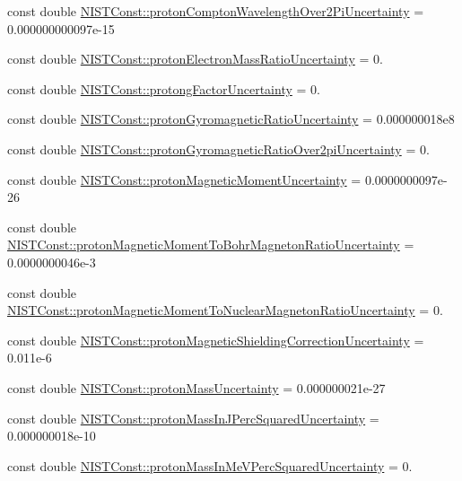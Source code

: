 \begin{DoxyCompactItemize}
\item 
const double \hyperlink{group___n_i_s_t_const-_proton_ga186c0793c8cc85f31697d61b2cce6131}{N\+I\+S\+T\+Const\+::proton\+Compton\+Wavelength\+Over2\+Pi\+Uncertainty} = 0.\+000000000097e-\/15
\item 
const double \hyperlink{group___n_i_s_t_const-_proton_ga32c824b498d8050a6b950467ed18344e}{N\+I\+S\+T\+Const\+::proton\+Electron\+Mass\+Ratio\+Uncertainty} = 0.
\item 
const double \hyperlink{group___n_i_s_t_const-_proton_ga0da65a4c99a5f1d339864c1f3e530a5b}{N\+I\+S\+T\+Const\+::protong\+Factor\+Uncertainty} = 0.
\item 
const double \hyperlink{group___n_i_s_t_const-_proton_gaa71b7de7eab3c78be5f0fa7851d284e2}{N\+I\+S\+T\+Const\+::proton\+Gyromagnetic\+Ratio\+Uncertainty} = 0.\+000000018e8
\item 
const double \hyperlink{group___n_i_s_t_const-_proton_ga107cde2344578ef79ee219b74184a25b}{N\+I\+S\+T\+Const\+::proton\+Gyromagnetic\+Ratio\+Over2pi\+Uncertainty} = 0.
\item 
const double \hyperlink{group___n_i_s_t_const-_proton_ga4ea801fdf73e61bbf8e984c88a50dabb}{N\+I\+S\+T\+Const\+::proton\+Magnetic\+Moment\+Uncertainty} = 0.\+0000000097e-\/26
\item 
const double \hyperlink{group___n_i_s_t_const-_proton_gae14639315fdecf1e78b18de5468b8acf}{N\+I\+S\+T\+Const\+::proton\+Magnetic\+Moment\+To\+Bohr\+Magneton\+Ratio\+Uncertainty} = 0.\+0000000046e-\/3
\item 
const double \hyperlink{group___n_i_s_t_const-_proton_gaa4c8406d5e6355f61b1c78ad5f85cda1}{N\+I\+S\+T\+Const\+::proton\+Magnetic\+Moment\+To\+Nuclear\+Magneton\+Ratio\+Uncertainty} = 0.
\item 
const double \hyperlink{group___n_i_s_t_const-_proton_ga5a9d8dc245061602b0193dd808d54ffc}{N\+I\+S\+T\+Const\+::proton\+Magnetic\+Shielding\+Correction\+Uncertainty} = 0.\+011e-\/6
\item 
const double \hyperlink{group___n_i_s_t_const-_proton_ga14f058f91a60fc3dff5e707b28b3f737}{N\+I\+S\+T\+Const\+::proton\+Mass\+Uncertainty} = 0.\+000000021e-\/27
\item 
const double \hyperlink{group___n_i_s_t_const-_proton_ga192b0caed878dce33d9f2f05470577d0}{N\+I\+S\+T\+Const\+::proton\+Mass\+In\+J\+Perc\+Squared\+Uncertainty} = 0.\+000000018e-\/10
\item 
const double \hyperlink{group___n_i_s_t_const-_proton_gac4e3bb5aa0cf6f869efc7fcb6c691dab}{N\+I\+S\+T\+Const\+::proton\+Mass\+In\+Me\+V\+Perc\+Squared\+Uncertainty} = 0.

\end{DoxyCompactItemize}
